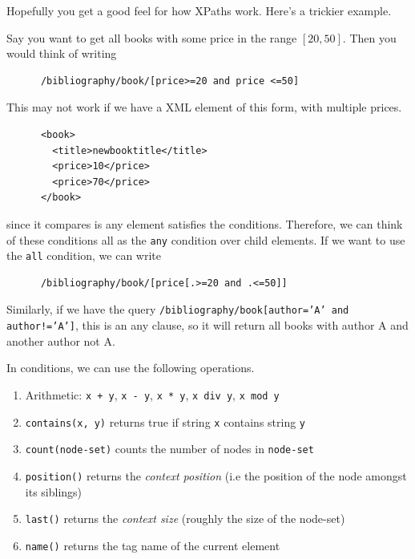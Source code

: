   Hopefully you get a good feel for how XPaths work. Here's a trickier example. 

  \begin{example}
    Say you want to get all books with some price in the range $[20, 50]$. Then you would think of writing 
    \begin{lstlisting}
      /bibliography/book/[price>=20 and price <=50]
    \end{lstlisting}
    This may not work if we have a XML element of this form, with multiple prices. 
    \begin{lstlisting}
      <book> 
        <title>newbooktitle</title>
        <price>10</price>
        <price>70</price> 
      </book>
    \end{lstlisting} 
    since it compares is any element satisfies the conditions. Therefore, we can think of these conditions all as the \texttt{any} condition over child elements. If we want to use the \texttt{all} condition, we can write 
    \begin{lstlisting}
      /bibliography/book/[price[.>=20 and .<=50]]
    \end{lstlisting}

    Similarly, if we have the query \texttt{/bibliography/book[author='A' and author!='A']}, this is an any clause, so it will return all books with author A and another author not A. 
  \end{example}

  \begin{definition} 
    In conditions, we can use the following operations. 
    \begin{enumerate}
      \item Arithmetic: \texttt{x + y}, \texttt{x - y}, \texttt{x * y}, \texttt{x div y}, \texttt{x mod y} 
      \item \texttt{contains(x, y)} returns true if string \texttt{x} contains string \texttt{y} 
      \item \texttt{count(node-set)} counts the number of nodes in \texttt{node-set} 
      \item \texttt{position()} returns the \textit{context position} (i.e the position of the node amongst its siblings) 
      \item \texttt{last()} returns the \textit{context size} (roughly the size of the node-set)
      \item \texttt{name()} returns the tag name of the current element
    \end{enumerate}
  \end{definition}

